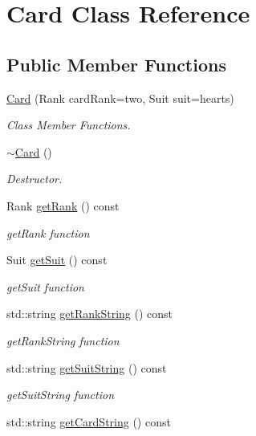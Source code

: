 \hypertarget{classCard}{\section{Card Class Reference}
\label{classCard}
}
\subsection*{Public Member Functions}
\begin{DoxyCompactItemize}
\item 
\hyperlink{classCard_ae3c2544c0a32c8f85ebbe87d35589c1d}{Card} (Rank card\-Rank=two, Suit suit=hearts)
\begin{DoxyCompactList}\small\item\em Class Member Functions. \end{DoxyCompactList}\item 
\hyperlink{classCard_a4e05b0b68e43e5e76c6194458cee874f}{$\sim$\-Card} ()
\begin{DoxyCompactList}\small\item\em Destructor. \end{DoxyCompactList}\item 
Rank \hyperlink{classCard_a189fd6e637baa9301b194bcd4b4c358f}{get\-Rank} () const 
\begin{DoxyCompactList}\small\item\em get\-Rank function \end{DoxyCompactList}\item 
Suit \hyperlink{classCard_a12ba8327404ffc12ecb1b71791690d80}{get\-Suit} () const 
\begin{DoxyCompactList}\small\item\em get\-Suit function \end{DoxyCompactList}\item 
std\-::string \hyperlink{classCard_aaa3caa33df8c1743daccdaa4419c8851}{get\-Rank\-String} () const 
\begin{DoxyCompactList}\small\item\em get\-Rank\-String function \end{DoxyCompactList}\item 
std\-::string \hyperlink{classCard_a40f752dffc851ee633675e417f18d79e}{get\-Suit\-String} () const 
\begin{DoxyCompactList}\small\item\em get\-Suit\-String function \end{DoxyCompactList}\item 
std\-::string \hyperlink{classCard_a1b680738cb9b9e674487ba1b16de2dce}{get\-Card\-String} () const 

\end{DoxyCompactItemize}
